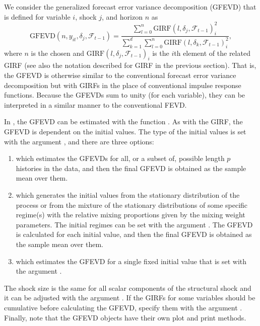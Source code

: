 \documentclass[nojss]{jss}
\begin{document}
We consider the generalized forecast error variance decomposition (GFEVD) \citep{Lanne+Nyberg:2016}  that is defined for variable $i$, shock $j$, and horizon $n$ as
\begin{equation}
\text{GFEVD}(n,y_{it}, \delta_j,\mathcal{F}_{t-1}) = \frac{\sum_{l=0}^n\text{GIRF}(l,\delta_j,\mathcal{F}_{t-1})_i^2}{\sum_{k=1}^d\sum_{l=0}^n\text{GIRF}(l,\delta_k,\mathcal{F}_{t-1})_i^2},
\end{equation}
where $n$ is the chosen and $\text{GIRF}(l,\delta_j,\mathcal{F}_{t-1})_i$ is the $i$th element of the related GIRF (see also the notation described for GIRF in the previous section). That is, the GFEVD is otherwise similar to the conventional forecast error variance decomposition but with GIRFs in the place of conventional impulse response functions. Because the GFEVDs sum to unity (for each variable), they can be interpreted in a similar manner to the conventional FEVD.

In , the GFEVD can be estimated with the function . As with the GIRF, the GFEVD is dependent on the initial values. The type of the initial values is set with the argument , and there are three options:
\begin{enumerate}
\item {} which estimates the GFEVDs for all, or a subset of, possible length $p$ histories in the data, and then the final GFEVD is obtained as the sample mean over them.
\item {} which generates the initial values from the stationary distribution of the process or from the mixture of the stationary distributions of some specific regime(s) with the relative mixing proportions given by the mixing weight parameters. The initial regimes can be set with the argument . The GFEVD is calculated for each initial value, and then the final GFEVD is obtained as the sample mean over them.
\item {} which estimates the GFEVD for a single fixed initial value that is set with the argument .
\end{enumerate}
The shock size is the same for all scalar components of the structural shock and it can be adjusted with the argument . If the GIRFs for some variables should be cumulative before calculating the GFEVD, specify them with the argument . Finally, note that the GFEVD objects have their own plot and print methods.
\end{document}
